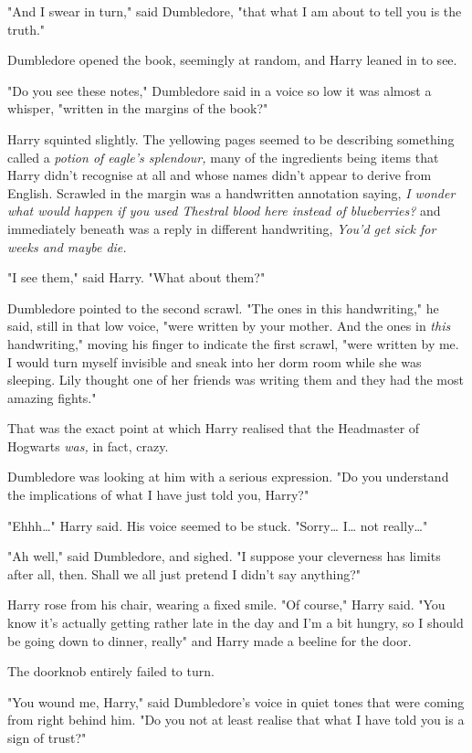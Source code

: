 "And I swear in turn," said Dumbledore, "that what I am about to tell you is 
the truth."

Dumbledore opened the book, seemingly at random, and Harry leaned in to see.

"Do you see these notes," Dumbledore said in a voice so low it was almost a 
whisper, "written in the margins of the book?"

Harry squinted slightly. The yellowing pages seemed to be describing something 
called a \emph{potion of eagle's splendour,} many of the ingredients being 
items that Harry didn't recognise at all and whose names didn't appear to 
derive from English. Scrawled in the margin was a handwritten annotation 
saying, \emph{I wonder what would happen if you used Thestral blood here 
instead of blueberries?} and immediately beneath was a reply in different 
handwriting, \emph{You'd get sick for weeks and maybe die.}

"I see them," said Harry. "What about them?"

Dumbledore pointed to the second scrawl. "The ones in this handwriting," he 
said, still in that low voice, "were written by your mother. And the ones in 
\emph{this} handwriting," moving his finger to indicate the first scrawl, "were 
written by me. I would turn myself invisible and sneak into her dorm room while 
she was sleeping. Lily thought one of her friends was writing them and they had 
the most amazing fights."

That was the exact point at which Harry realised that the Headmaster of 
Hogwarts \emph{was,} in fact, crazy.

Dumbledore was looking at him with a serious expression. "Do you understand the 
implications of what I have just told you, Harry?"

"Ehhh{\ldots}" Harry said. His voice seemed to be stuck. "Sorry{\ldots} 
I{\ldots} not really{\ldots}"

"Ah well," said Dumbledore, and sighed. "I suppose your cleverness has limits 
after all, then. Shall we all just pretend I didn't say anything?"

Harry rose from his chair, wearing a fixed smile. "Of course," Harry said. "You 
know it's actually getting rather late in the day and I'm a bit hungry, so I 
should be going down to dinner, really" and Harry made a beeline for the door.

The doorknob entirely failed to turn.

"You wound me, Harry," said Dumbledore's voice in quiet tones that were coming 
from right behind him. "Do you not at least realise that what I have told you 
is a sign of trust?"


